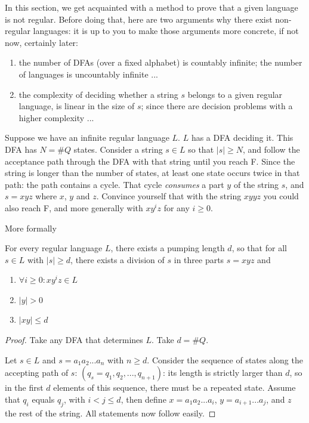 In this section, we get acquainted with a method to prove that a given
language is not regular. Before doing that, here are two arguments why
there exist non-regular languages: it is up to you to make those
arguments more concrete, if not now, certainly later:
\begin{enumerate}

\item
the number of DFAs (over a fixed alphabet) is countably infinite; the
number of languages is uncountably infinite ...

\item
the complexity of deciding whether a string $s$ belongs to a given
regular language, is linear in the size of $s$; since there are
decision problems with a higher complexity ...

\end{enumerate}


Suppose we have an infinite regular language $L$. $L$ has a DFA
deciding it. This DFA has $N = \#Q$ states. Consider a string $s \in
L$ so that $|s| \geq N$, and follow the acceptance path through the DFA
with that string until you reach F. Since the string is longer than
the number of states, at least one state occurs twice in that path:
the path contains a cycle. That cycle {\em consumes} a part $y$ of the
string $s$, and $s = xyz$ where $x$, $y$ and $z$. Convince yourself
that with the string $xyyz$ you could also reach F, and more generally
with $xy^iz$ for any $i \geq 0$.

More formally

\begin{theorem}
For every regular language $L$, there exists a pumping length $d$,
so that
%
for all $s \in L$ with $|s| \geq d$, there exists a division of $s$ in
three parts $s = xyz$ and
\begin{enumerate}
\item
$\forall i \ge 0: xy^iz \in L$


\item
$|y| > 0$


\item
$|xy| \leq d$
\end{enumerate}
\end{theorem}
\begin{proof}
Take any DFA that determines $L$. Take $d = \#Q$.

Let $s \in L$ and $s = a_1a_2...a_n$ with $n \geq d$.
Consider the sequence of states along the accepting path of $s$:
$(q_s=q_1,q_2,...,q_{n+1})$: its length is strictly larger than $d$,
so in the first $d$ elements of this sequence, there must be a
repeated state. Assume that $q_i$ equals $q_j$, with $i < j \leq d$,
then define $x = a_1a_2...a_{i}$, $y = a_{i+1}...a_j$, and $z$ the
rest of the string. All statements now follow easily.
\end{proof}

